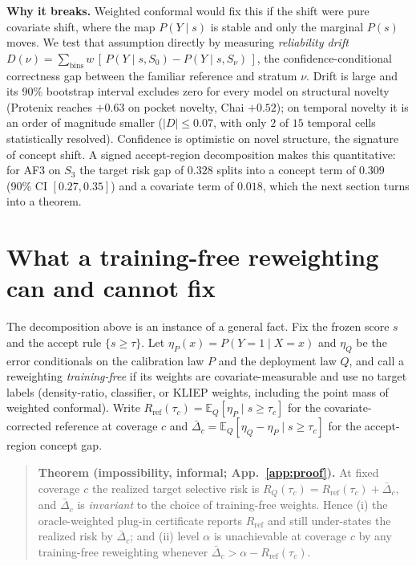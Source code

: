 \documentclass[10pt]{article}
\begin{document}
\textbf{Why it breaks.} Weighted conformal would fix this if the shift were pure covariate shift,
where the map $P(Y\mid s)$ is stable and only the marginal $P(s)$ moves. We test that assumption
directly by measuring \emph{reliability drift}
$D(\nu)=\sum_{\text{bins}} w\,[\,P(Y\mid s,S_0)-P(Y\mid s,S_\nu)\,]$, the confidence-conditional
correctness gap between the familiar reference and stratum $\nu$. Drift is large and its 90\%
bootstrap interval excludes zero for every model on structural novelty (Protenix reaches $+0.63$
on pocket novelty, Chai $+0.52$); on temporal novelty it is an order of magnitude smaller
($|D|\le0.07$, with only $2$ of $15$ temporal cells statistically resolved). Confidence is
optimistic on novel structure, the signature of concept shift. A signed accept-region decomposition
makes this quantitative: for AF3 on $S_3$ the target risk gap of $0.328$ splits into a concept term
of $0.309$ (90\% CI $[0.27,0.35]$) and a covariate term of $0.018$, which the next section turns
into a theorem.

\section{What a training-free reweighting can and cannot fix}\label{sec:theory}
The decomposition above is an instance of a general fact. Fix the frozen score $s$ and the accept
rule $\{s\ge\tau\}$. Let $\eta_P(x)=P(Y{=}1\mid X{=}x)$ and $\eta_Q$ be the error conditionals on
the calibration law $P$ and the deployment law $Q$, and call a reweighting \emph{training-free} if
its weights are covariate-measurable and use no target labels (density-ratio, classifier, or
KLIEP weights, including the point mass of weighted conformal). Write $R_{\mathrm{ref}}(\tau_c)=
\mathbb{E}_Q[\eta_P\mid s\ge\tau_c]$ for the covariate-corrected reference at coverage $c$ and
$\bar\Delta_c=\mathbb{E}_Q[\eta_Q-\eta_P\mid s\ge\tau_c]$ for the accept-region concept gap.

\begin{quote}\small
\textbf{Theorem (impossibility, informal; App.~\ref{app:proof}).} At fixed coverage $c$ the realized
target selective risk is $R_Q(\tau_c)=R_{\mathrm{ref}}(\tau_c)+\bar\Delta_c$, and $\bar\Delta_c$ is
\emph{invariant} to the choice of training-free weights. Hence (i) the oracle-weighted plug-in
certificate reports $R_{\mathrm{ref}}$ and still under-states the realized risk by $\bar\Delta_c$;
and (ii) level $\alpha$
is unachievable at coverage $c$ by any training-free reweighting whenever
$\bar\Delta_c>\alpha-R_{\mathrm{ref}}(\tau_c)$.
\end{quote}
\end{document}
